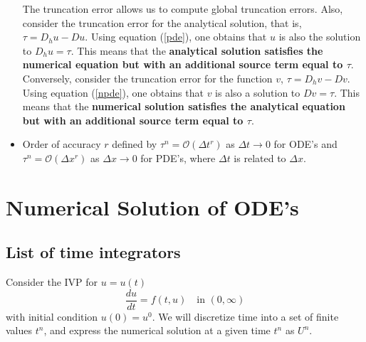 \documentclass[oneside,a4paper,11pt]{report}
\begin{document}
\begin{itemize}
The truncation error allows us to compute global truncation errors. Also, consider the truncation error for the analytical solution, that is, $\tau = D_hu - Du$. Using equation (\ref{pde}), one obtains that $u$ is also the solution to $D_hu = \tau$. This means that the \textbf{analytical solution satisfies the numerical equation but with an additional source term equal to $\tau$}. Conversely, consider the truncation error for the function $v$, $\tau = D_hv - Dv$. Using equation (\ref{npde}), one obtains that $v$ is also a solution to $Dv = \tau$. This means that the \textbf{numerical solution satisfies the analytical equation but with an additional source term equal to $\tau$}.

\item Order of accuracy $r$ defined by $\tau^n = \mathcal{O}(\Delta t^r)$ as $\Delta t \to 0$ for ODE's and $\tau^n = \mathcal{O}(\Delta x^r)$ as $\Delta x \to 0$ for PDE's, where $\Delta t$ is related to $\Delta x$.

\end{itemize}

\part{Numerical Solution of ODE's}

\chapter{List of time integrators}
Consider the IVP for $u=u(t)$
\begin{equation}
\label{ode}
\frac{du}{dt} = f(t, u) \quad \text{in } (0,\infty)
\end{equation}
with initial condition $u(0) = u^0$. We will discretize time into a set of finite values $t^n$, and express the numerical solution at a given time $t^n$ as $U^n$. 

\end{document}
